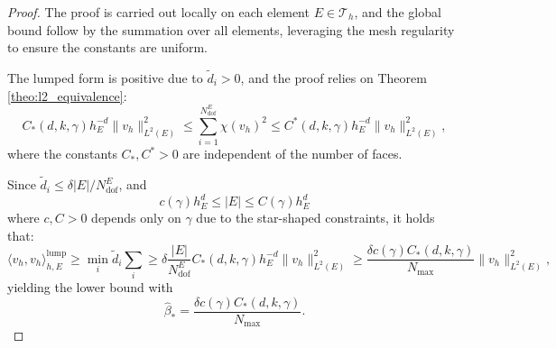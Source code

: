 \documentclass{article}
\newcommand{\numdofs}{N^E_{\text{dof}}}
\newcommand{\lebesguespace}[1]{L^2(#1)}
\begin{document}
\begin{proof}
    The proof is carried out locally on each element $E \in \mathcal{T}_h$, and the global bound follow by the summation over all elements, leveraging the mesh regularity to ensure the constants are uniform.

    The lumped form is positive due to $\tilde{d}_i > 0$, and the proof relies on Theorem \ref{theo:l2_equivalence}:
    \begin{equation}
        \nonumber
        C_*(d,k,\gamma) h_E^{-d} \| v_h \|_{\lebesguespace{E}}^2 \leq \sum \limits^{\numdofs}_{i=1} \chi (v_h)^2 \leq C^*(d,k,\gamma)h_E^{-d}\| v_h \|^2_{\lebesguespace{E}},
    \end{equation}
    where the constants $C_*, C^*>0$ are independent of the number of faces.

    Since $\tilde{d}_i \leq \delta |E|/\numdofs$, and
    \begin{equation}\label{eq:aux_upper_bound}
        c(\gamma) h_E^d \leq |E| \leq C(\gamma) h_E^d
    \end{equation}
    where $c, C > 0$ depends only on $\gamma$ due to the star-shaped constraints, it holds that:
    \begin{equation}
        \nonumber
        \langle v_h, v_h\rangle^{\text{lump}}_{h,E} \geq \min \limits_i \tilde{d}_i \sum \limits_i \geq \delta \frac{|E|}{\numdofs} C_*(d,k,\gamma) h_E^{-d} \| v_h \|^2_{\lebesguespace{E}} \geq \frac{\delta c(\gamma) C_* (d,k,\gamma)}{N_{\max}} \| v_h \|^2_{\lebesguespace{E}},
    \end{equation}
    yielding the lower bound with 
    \begin{equation}
        \nonumber
        \hat{\beta}_* = \frac{\delta c(\gamma) C_*(d,k,\gamma)}{N_{\max}}.
    \end{equation}


\end{proof}
\end{document}
